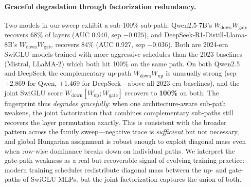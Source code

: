 \documentclass[wcp]{jmlr}
\begin{document}
\paragraph{Graceful degradation through factorization redundancy.}
Two models in our sweep exhibit a sub-100\% sub-path: Qwen2.5-7B's $W_{\text{down}}W_{\text{gate}}$ recovers 68\% of layers (AUC 0.940, sep $-0.025$), and DeepSeek-R1-Distill-Llama-8B's $W_{\text{down}}W_{\text{gate}}$ recovers 84\% (AUC 0.927, sep $-0.036$). Both are 2024-era SwiGLU models trained with more aggressive schedules than the 2023 baselines (Mistral, LLaMA-2) which both hit 100\% on the same path. On both Qwen2.5 and DeepSeek the complementary up-path $W_{\text{down}}W_{\text{up}}$ is unusually strong (sep $+2.869$ for Qwen, $+1.469$ for DeepSeek---above all 2023-era baselines), and the joint SwiGLU score $W_{\text{down}}[W_{\text{up}};W_{\text{gate}}]$ recovers to \textbf{100\%} on both. The fingerprint thus \emph{degrades gracefully}: when one architecture-aware sub-path weakens, the joint factorization that combines complementary sub-paths still recovers the layer permutation exactly. This is consistent with the broader pattern across the family sweep---negative trace is \emph{sufficient} but not necessary, and global Hungarian assignment is robust enough to exploit diagonal mass even when row-wise dominance breaks down on individual paths. We interpret the gate-path weakness as a real but recoverable signal of evolving training practice: modern training schedules redistribute diagonal mass between the up- and gate-paths of SwiGLU MLPs, but the joint factorization captures the union of both.
\end{document}
